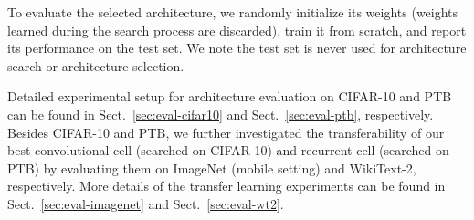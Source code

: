 \documentclass{article}
\begin{document}
To evaluate the selected architecture,
we randomly initialize its weights (weights learned during the search process are discarded),
train it from scratch,
and report its performance on the test set.
We note the test set is never used for architecture search or architecture selection.

Detailed experimental setup for architecture evaluation on CIFAR-10 and PTB can be found in Sect.~\ref{sec:eval-cifar10} and Sect.~\ref{sec:eval-ptb}, respectively. Besides CIFAR-10 and PTB,
we further investigated the transferability of our best convolutional cell (searched on CIFAR-10) and recurrent cell (searched on PTB) by evaluating them on ImageNet (mobile setting) and WikiText-2, respectively. More details of the transfer learning experiments can be found in Sect.~\ref{sec:eval-imagenet} and Sect.~\ref{sec:eval-wt2}.
\end{document}
